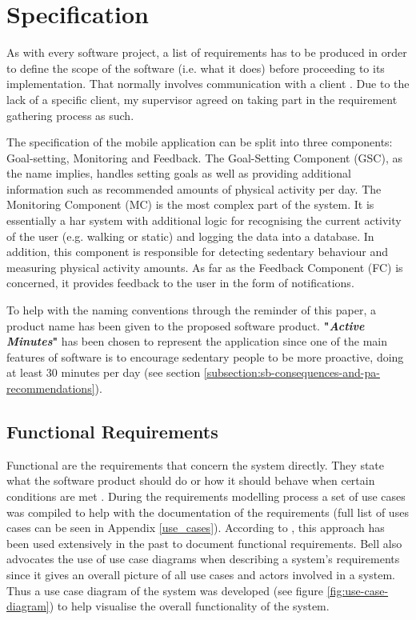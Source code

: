 \chapter{Specification}
\label{Chapter:Specification}

As with every software project, a list of requirements has to be produced in order to define the scope of the software (i.e. what it does) before proceeding to its implementation. That normally involves communication with a client \citep[23]{bell2005}. Due to the lack of a specific client, my supervisor agreed on taking part in the requirement gathering process as such.

The specification of the mobile application can be split into three components: Goal-setting, Monitoring and Feedback. The Goal-Setting Component (GSC), as the name implies, handles setting goals as well as providing additional information such as recommended amounts of physical activity per day. The Monitoring Component (MC) is the most complex part of the system. It is essentially a \gls{har} system with additional logic for recognising the current activity of the user (e.g. walking or static) and logging the data into a database. In addition, this component is responsible for detecting sedentary behaviour and measuring physical activity amounts. As far as the Feedback Component (FC) is concerned, it provides feedback to the user in the form of notifications.

To help with the naming conventions through the reminder of this paper, a product name has been given to the proposed software product. \textbf{"\textit{Active Minutes}"} has been chosen to represent the application since one of the main features of software is to encourage sedentary people to be more proactive, doing at least 30 minutes per day (see section \ref{subsection:sb-consequences-and-pa-recommendations}).

\section{Functional Requirements}
    Functional are the requirements that concern the system directly. They state what the software product should do or how it should behave when certain conditions are met \citep[84]{sommerville2010}. During the requirements modelling process a set of use cases was compiled to help with the documentation of the requirements (full list of uses cases can be seen in Appendix \ref{use_cases}). According to \citet[45-47]{bell2005}, this approach has been used extensively in the past to document functional requirements. Bell also advocates the use of use case diagrams when describing a system's requirements since it gives an overall picture of all use cases and actors involved in a system. Thus a use case diagram of the system was developed (see figure \ref{fig:use-case-diagram}) to help visualise the overall functionality of the system.
    

